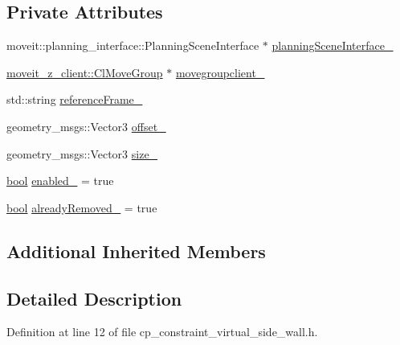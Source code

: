 \subsection*{Private Attributes}
\begin{DoxyCompactItemize}
\item 
moveit\+::planning\+\_\+interface\+::\+Planning\+Scene\+Interface $\ast$ \hyperlink{classsm__moveit__4_1_1cl__moveit__z__client_1_1CpConstraintVirtualSideWall_a50a72a86820c23dde2c433c8500f10bd}{planning\+Scene\+Interface\+\_\+}
\item 
\hyperlink{classmoveit__z__client_1_1ClMoveGroup}{moveit\+\_\+z\+\_\+client\+::\+Cl\+Move\+Group} $\ast$ \hyperlink{classsm__moveit__4_1_1cl__moveit__z__client_1_1CpConstraintVirtualSideWall_a0232826a9835e4d0642f295daab435c5}{movegroupclient\+\_\+}
\item 
std\+::string \hyperlink{classsm__moveit__4_1_1cl__moveit__z__client_1_1CpConstraintVirtualSideWall_a0b43e5e3942efb3498a919accffbc3cc}{reference\+Frame\+\_\+}
\item 
geometry\+\_\+msgs\+::\+Vector3 \hyperlink{classsm__moveit__4_1_1cl__moveit__z__client_1_1CpConstraintVirtualSideWall_acefab4905c8cb5f72122c84310cfeb7c}{offset\+\_\+}
\item 
geometry\+\_\+msgs\+::\+Vector3 \hyperlink{classsm__moveit__4_1_1cl__moveit__z__client_1_1CpConstraintVirtualSideWall_ae249e70499ae591a06d24b9b9877d3c6}{size\+\_\+}
\item 
\hyperlink{classbool}{bool} \hyperlink{classsm__moveit__4_1_1cl__moveit__z__client_1_1CpConstraintVirtualSideWall_a4456f8bf8328d103c2f9d3a04182babd}{enabled\+\_\+} = true
\item 
\hyperlink{classbool}{bool} \hyperlink{classsm__moveit__4_1_1cl__moveit__z__client_1_1CpConstraintVirtualSideWall_a99dce43a47cbd8774e2f7deb1b3e1c47}{already\+Removed\+\_\+} = true
\end{DoxyCompactItemize}
\subsection*{Additional Inherited Members}


\subsection{Detailed Description}


Definition at line 12 of file cp\+\_\+constraint\+\_\+virtual\+\_\+side\+\_\+wall.\+h.



